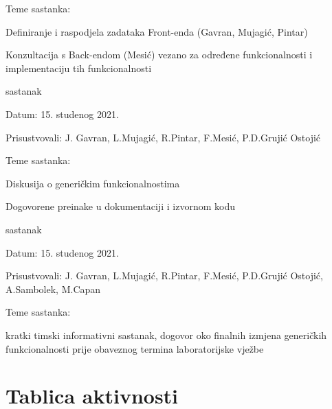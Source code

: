 \begin{packed_enum}
\begin{packed_item}
    			\item Teme sastanka:
    			\begin{packed_item}
    				\item Definiranje i raspodjela zadataka Front-enda (Gavran, Mujagić, Pintar)
    				\item Konzultacija s Back-endom (Mesić) vezano za određene funkcionalnosti i implementaciju tih funkcionalnosti 
    			\end{packed_item}
    		\end{packed_item}	
    		\item  sastanak
    		\item[] \begin{packed_item}
    			\item Datum: 15. studenog 2021.
    			\item Prisustvovali: J. Gavran, L.Mujagić, R.Pintar, F.Mesić, P.D.Grujić Ostojić
    			\item Teme sastanka:
    			\begin{packed_item}
    				\item Diskusija o generičkim funkcionalnostima 
    				\item Dogovorene preinake u dokumentaciji i izvornom kodu
    			\end{packed_item}
    		\end{packed_item}	
    	
	    	\item  sastanak
	    	\item[] \begin{packed_item}
	    		\item Datum: 15. studenog 2021.
	    		\item Prisustvovali: J. Gavran, L.Mujagić, R.Pintar, F.Mesić, P.D.Grujić Ostojić, A.Sambolek, M.Capan
	    		\item Teme sastanka:
	    		\begin{packed_item}
	    			\item kratki timski informativni sastanak, dogovor oko finalnih izmjena generičkih funkcionalnosti prije obaveznog termina laboratorijske vježbe
	    		\end{packed_item}
	    	\end{packed_item}	
			
			
		\end{packed_enum}
		
		\eject
		\section*{Tablica aktivnosti}
		
